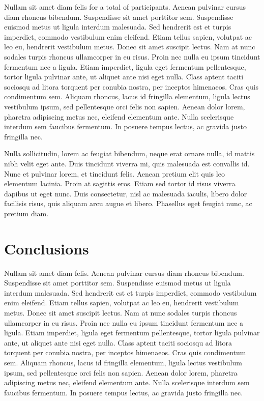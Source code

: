 Nullam sit amet diam felis for a total of \TotalParticipantsStudyOne{} participants. Aenean pulvinar cursus diam rhoncus bibendum.
Suspendisse sit amet porttitor sem.  Suspendisse euismod metus ut ligula
interdum malesuada.  Sed hendrerit est et turpis imperdiet, commodo
vestibulum enim eleifend.  Etiam tellus sapien, volutpat ac leo eu,
hendrerit vestibulum metus.  Donec sit amet suscipit lectus.  Nam at nunc
sodales turpis rhoncus ullamcorper in eu risus.  Proin nec nulla eu ipsum
tincidunt fermentum nec a ligula.  Etiam imperdiet, ligula eget fermentum
pellentesque, tortor ligula pulvinar ante, ut aliquet ante nisi eget nulla. 
Class aptent taciti sociosqu ad litora torquent per conubia nostra, per
inceptos himenaeos.  Cras quis condimentum sem.  Aliquam rhoncus, lacus id
fringilla elementum, ligula lectus vestibulum ipsum, sed pellentesque orci
felis non sapien.  Aenean dolor lorem, pharetra adipiscing metus nec,
eleifend elementum ante.  Nulla scelerisque interdum sem faucibus fermentum. 
In posuere tempus lectus, ac gravida justo fringilla nec.

Nulla sollicitudin, lorem ac feugiat bibendum, neque erat ornare nulla, id
mattis nibh velit eget ante.  Duis tincidunt viverra mi, quis malesuada est
convallis id.  Nunc et pulvinar lorem, et tincidunt felis.  Aenean pretium
elit quis leo elementum lacinia.  Proin at sagittis eros.  Etiam sed tortor
id risus viverra dapibus ut eget nunc.  Duis consectetur, nisl ac malesuada
iaculis, libero dolor facilisis risus, quis aliquam arcu augue et libero. 
Phasellus eget feugiat nunc, ac pretium diam.

\section{Conclusions}
\label{sec:studyone:conclusions}

Nullam sit amet diam felis. Aenean pulvinar cursus diam rhoncus bibendum.
Suspendisse sit amet porttitor sem.  Suspendisse euismod metus ut ligula
interdum malesuada.  Sed hendrerit est et turpis imperdiet, commodo
vestibulum enim eleifend.  Etiam tellus sapien, volutpat ac leo eu,
hendrerit vestibulum metus.  Donec sit amet suscipit lectus.  Nam at nunc
sodales turpis rhoncus ullamcorper in eu risus.  Proin nec nulla eu ipsum
tincidunt fermentum nec a ligula.  Etiam imperdiet, ligula eget fermentum
pellentesque, tortor ligula pulvinar ante, ut aliquet ante nisi eget nulla. 
Class aptent taciti sociosqu ad litora torquent per conubia nostra, per
inceptos himenaeos.  Cras quis condimentum sem.  Aliquam rhoncus, lacus id
fringilla elementum, ligula lectus vestibulum ipsum, sed pellentesque orci
felis non sapien.  Aenean dolor lorem, pharetra adipiscing metus nec,
eleifend elementum ante.  Nulla scelerisque interdum sem faucibus fermentum. 
In posuere tempus lectus, ac gravida justo fringilla nec.

